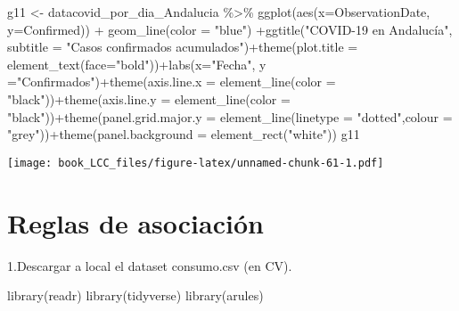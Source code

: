 \documentclass[
]{book}
\newenvironment{Shaded}{\begin{snugshade}}{\end{snugshade}}
\newcommand{\AttributeTok}[1]{\textcolor[rgb]{0.77,0.63,0.00}{#1}}
\newcommand{\FunctionTok}[1]{\textcolor[rgb]{0.00,0.00,0.00}{#1}}
\newcommand{\NormalTok}[1]{#1}
\newcommand{\OtherTok}[1]{\textcolor[rgb]{0.56,0.35,0.01}{#1}}
\newcommand{\SpecialCharTok}[1]{\textcolor[rgb]{0.00,0.00,0.00}{#1}}
\newcommand{\StringTok}[1]{\textcolor[rgb]{0.31,0.60,0.02}{#1}}
\begin{document}
\begin{Shaded}
\begin{Highlighting}[]
\NormalTok{g11 }\OtherTok{\textless{}{-}}\NormalTok{ datacovid\_por\_dia\_Andalucia }\SpecialCharTok{\%\textgreater{}\%}
    \FunctionTok{ggplot}\NormalTok{(}\FunctionTok{aes}\NormalTok{(}\AttributeTok{x=}\NormalTok{ObservationDate, }\AttributeTok{y=}\NormalTok{Confirmed)) }\SpecialCharTok{+}  \FunctionTok{geom\_line}\NormalTok{(}\AttributeTok{color =} \StringTok{"blue"}\NormalTok{) }\SpecialCharTok{+}\FunctionTok{ggtitle}\NormalTok{(}\StringTok{"COVID{-}19 en Andalucía"}\NormalTok{, }\AttributeTok{subtitle =} \StringTok{"Casos confirmados acumulados"}\NormalTok{)}\SpecialCharTok{+}\FunctionTok{theme}\NormalTok{(}\AttributeTok{plot.title =} \FunctionTok{element\_text}\NormalTok{(}\AttributeTok{face=}\StringTok{"bold"}\NormalTok{))}\SpecialCharTok{+}\FunctionTok{labs}\NormalTok{(}\AttributeTok{x=}\StringTok{"Fecha"}\NormalTok{, }\AttributeTok{y =}\StringTok{"Confirmados"}\NormalTok{)}\SpecialCharTok{+}\FunctionTok{theme}\NormalTok{(}\AttributeTok{axis.line.x =} \FunctionTok{element\_line}\NormalTok{(}\AttributeTok{color =} \StringTok{"black"}\NormalTok{))}\SpecialCharTok{+}\FunctionTok{theme}\NormalTok{(}\AttributeTok{axis.line.y =} \FunctionTok{element\_line}\NormalTok{(}\AttributeTok{color =} \StringTok{"black"}\NormalTok{))}\SpecialCharTok{+}\FunctionTok{theme}\NormalTok{(}\AttributeTok{panel.grid.major.y =} \FunctionTok{element\_line}\NormalTok{(}\AttributeTok{linetype =} \StringTok{"dotted"}\NormalTok{,}\AttributeTok{colour =} \StringTok{"grey"}\NormalTok{))}\SpecialCharTok{+}\FunctionTok{theme}\NormalTok{(}\AttributeTok{panel.background =} \FunctionTok{element\_rect}\NormalTok{(}\StringTok{"white"}\NormalTok{))}
\NormalTok{g11}
\end{Highlighting}
\end{Shaded}

\texttt{[image: book\_LCC\_files/figure-latex/unnamed-chunk-61-1.pdf]}

\hypertarget{reglas-de-asociaciuxf3n}{%
\chapter{Reglas de asociación}\label{reglas-de-asociaciuxf3n}}

1.Descargar a local el dataset consumo.csv (en CV).

\begin{Shaded}
\begin{Highlighting}[]
\FunctionTok{library}\NormalTok{(readr)}
\FunctionTok{library}\NormalTok{(tidyverse)}
\FunctionTok{library}\NormalTok{(arules)}
\end{Highlighting}
\end{Shaded}
\end{document}
